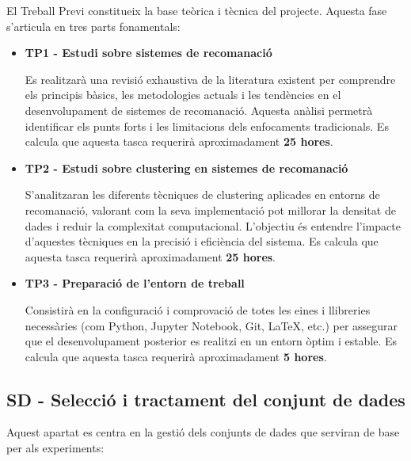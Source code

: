 \documentclass[a4paper,12pt]{report}
\begin{document}
El Treball Previ constitueix la base teòrica i tècnica del projecte.
Aquesta fase s’articula en tres parts fonamentals:

\begin{itemize}
    \item \textbf{TP1 - Estudi sobre sistemes de recomanació}
    
    Es realitzarà una revisió exhaustiva de la literatura existent per comprendre els principis bàsics, les metodologies actuals i les tendències en el desenvolupament de sistemes de recomanació.
    Aquesta anàlisi permetrà identificar els punts forts i les limitacions dels enfocaments tradicionals.
    Es calcula que aquesta tasca requerirà aproximadament \textbf{25 hores}.

    \item \textbf{TP2 - Estudi sobre clustering en sistemes de recomanació}
    
    S’analitzaran les diferents tècniques de clustering aplicades en entorns de recomanació, valorant com la seva implementació pot millorar la densitat de dades i reduir la complexitat computacional.
    L’objectiu és entendre l’impacte d’aquestes tècniques en la precisió i eficiència del sistema.
    Es calcula que aquesta tasca requerirà aproximadament \textbf{25 hores}.

    \item \textbf{TP3 - Preparació de l'entorn de treball}

    Consistirà en la configuració i comprovació de totes les eines i llibreries necessàries (com Python, Jupyter Notebook, Git, LaTeX, etc.) per assegurar que el desenvolupament posterior es realitzi en un entorn òptim i estable.
    Es calcula que aquesta tasca requerirà aproximadament \textbf{5 hores}.
\end{itemize}

\subsection{SD - Selecció i tractament del conjunt de dades}

Aquest apartat es centra en la gestió dels conjunts de dades que serviran de base per als experiments:
\end{document}
